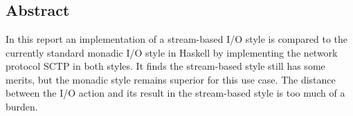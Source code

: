 \chapter*{}

\section*{Abstract}
In this report an implementation of a stream-based I/O style is compared to the currently standard monadic I/O style in Haskell by implementing the network protocol SCTP in both styles. It finds the stream-based style still has some merits, but the monadic style remains superior for this use case. The distance between the I/O action and its result in the stream-based style is too much of a burden.

